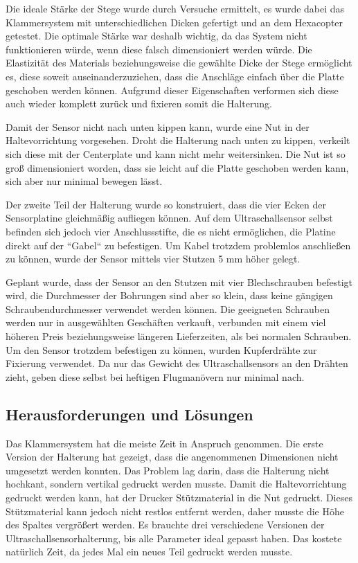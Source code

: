 	Die ideale Stärke der Stege wurde durch Versuche ermittelt, es wurde dabei das Klammersystem mit unterschiedlichen Dicken gefertigt und an dem Hexacopter getestet.
	Die optimale Stärke war deshalb wichtig, da das System nicht funktionieren würde, wenn diese falsch dimensioniert werden würde.
	Die Elastizität des Materials beziehungsweise die gewählte Dicke der Stege ermöglicht es, diese soweit auseinanderzuziehen, dass die Anschläge einfach über die Platte geschoben werden können.
	Aufgrund dieser Eigenschaften verformen sich diese auch wieder komplett zurück und fixieren somit die Halterung.

	Damit der Sensor nicht nach unten kippen kann, wurde eine Nut in der Haltevorrichtung vorgesehen.
	Droht die Halterung nach unten zu kippen, verkeilt sich diese mit der Centerplate und kann nicht mehr weitersinken.
	Die Nut ist so groß dimensioniert worden, dass sie leicht auf die Platte geschoben werden kann, sich aber nur minimal bewegen lässt.

	Der zweite Teil der Halterung wurde so konstruiert, dass die vier Ecken der Sensorplatine gleichmäßig aufliegen können.
	Auf dem Ultraschallsensor selbst befinden sich jedoch vier Anschlussstifte, die es nicht ermöglichen, die Platine direkt auf der “Gabel“ zu befestigen.
	Um Kabel trotzdem problemlos anschließen zu können, wurde der Sensor mittels vier Stutzen 5 mm höher gelegt.

	Geplant wurde, dass der Sensor an den Stutzen mit vier Blechschrauben befestigt wird, die Durchmesser der Bohrungen sind aber so klein, dass keine gängigen Schraubendurchmesser verwendet werden können.
	Die geeigneten Schrauben werden nur in ausgewählten Geschäften verkauft, verbunden mit einem viel höheren Preis beziehungsweise längeren Lieferzeiten, als bei normalen Schrauben.
	Um den Sensor trotzdem befestigen zu können, wurden Kupferdrähte zur Fixierung verwendet.
	Da nur das Gewicht des Ultraschallsensors an den Drähten zieht, geben diese selbst bei heftigen Flugmanövern nur minimal nach.

	\subsection{Herausforderungen und Lösungen}

	Das Klammersystem hat die meiste Zeit in Anspruch genommen.
	Die erste Version der Halterung hat gezeigt, dass die angenommenen Dimensionen nicht umgesetzt werden konnten.
	Das Problem lag darin, dass die Halterung nicht hochkant, sondern vertikal gedruckt werden musste.
	Damit die Haltevorrichtung gedruckt werden kann, hat der Drucker Stützmaterial in die Nut gedruckt.
	Dieses Stützmaterial kann jedoch nicht restlos entfernt werden, daher musste die Höhe des Spaltes vergrößert werden.
	Es brauchte drei verschiedene Versionen der Ultraschallsensorhalterung, bis alle Parameter ideal gepasst haben. Das kostete natürlich Zeit, da jedes Mal ein neues Teil gedruckt werden musste.


